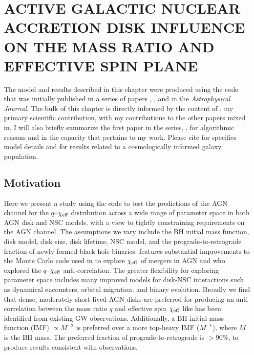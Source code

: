 \section{\texorpdfstring{\MakeUppercase{active galactic nuclear accretion disk influence on the mass ratio and effective spin plane}}{active galactic nuclear accretion disk influence on the mass ratio and effective spin plane}}
\label{sec:qXeff}


\par The model and results described in this chapter were produced using the \mcfacts code that was initially published in a series of papers \mcfacts {}
\citep{McKernan+25-mcfactsI}, \mcfacts {} \citep{Cook+25}, and \mcfacts {} \citep{Delfavero+25-mcfactsIII} in the \textit{Astrophysical Journal}.
The bulk of this chapter is directly informed by the content of \citet{Cook+25}, my primary scientific contribution, with my contributions to the other papers mixed in.
I will also briefly summarize the first paper in the series, \citet{McKernan+25-mcfactsI}, for algorithmic reasons and in the capacity that pertains to my work.
Please cite \citet{McKernan+25-mcfactsI} for specifics model details and \citet{Delfavero+25-mcfactsIII} for results related to a cosmologically informed galaxy population.

\subsection{Motivation}

Here we present a study using the \mcfacts code \citep{McKernan+25-mcfactsI, Cook+25, Delfavero+25-mcfactsIII} to test the predictions of the AGN channel for the $q$--$\chi_{\rm eff}$ distribution across a wide range of parameter space in both AGN disk and NSC models, with a view to tightly constraining requirements on the AGN channel.
The assumptions we vary include the BH initial mass function, disk model, disk size, disk lifetime, NSC model, and the prograde-to-retrograde fraction of newly formed black hole binaries.
\mcfacts features substantial improvements to the Monte Carlo code used in \citet{McKernan+20a} to explore $\chi_{\rm eff}$ of mergers in AGN and \citet{McKernan+22:q-Xeff} who explored the $q$--$\chi_{\rm eff}$ anti-correlation.
The greater flexibility for exploring parameter space includes many improved models for disk-NSC interactions such as dynamical encounters, orbital migration, and binary evolution.
Broadly we find that dense, moderately short-lived AGN disks are preferred for producing an anti-correlation between the mass ratio $q$ and effective spin $\chi_{\rm eff}$ like has been identified from existing GW observations.
Additionally, a BH initial mass function (IMF) $\propto M^{-2}$ is preferred over a more top-heavy IMF ($M^{-1}$), where $M$ is the BH mass.
The preferred fraction of prograde-to-retrograde is $>90\%$, to produce results consistent with observations.



